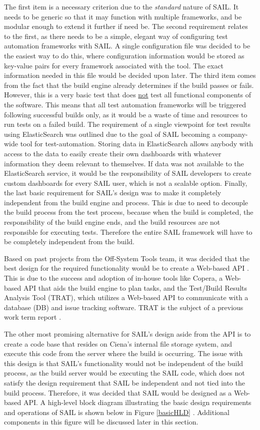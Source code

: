 \documentclass[10pt, titlepage, onecolumn, openany]{article}
\begin{document}
The first item is a necessary criterion due to the \textit{standard} nature of SAIL.
It needs to be generic so that it may function with multiple frameworks, and be
modular enough to extend it further if need be. The second requirement relates to the first,
as there needs to be a simple, elegant way of configuring test automation frameworks
with SAIL. A single configuration file was decided to be the easiest way to do this,
where configuration information would be stored as key-value pairs for every framework
associated with the tool. The exact information needed in this file would be decided upon
later. The third item comes from the fact that the build engine already determines if
the build passes or fails. However, this is a very basic test that does \underline{not}
test all functional components of the software. This means that all test automation
frameworks will be triggered following successful builds only, as it would be a
waste of time and resources to run tests on a failed build. The requirement of a
single viewpoint for test results using ElasticSearch was outlined due to the
goal of SAIL becoming a company-wide tool for test-automation. Storing data in
ElasticSearch allows anybody with access to the data to easily create their own
dashboards with whatever information they deem relevant to themselves. If data
was not available to the ElasticSearch service, it would be the responsibility
of SAIL developers to create custom dashboards for every SAIL user, which is not
a scalable option. Finally, the last basic requirement for SAIL's design was to
make it completely independent from the build engine and process. This is due to
need to decouple the build process from the test process, because when the build
is completed, the responsibility of the build engine ends, and the build
resources are not responsible for executing tests. Therefore the entire SAIL
framework will have to be completely independent from the build.

Based on past projects from the Off-System Tools team, it was decided that the
best design for the required functionality would be to create a Web-based API
\cite{pftoolsWebApi}. This is due to the success and adoption of in-house tools
like Copera, a Web-based API that aids the build engine to plan tasks, and the
Test/Build Results Analysis Tool (TRAT), which utilizes a Web-based API to
communicate with a database (DB) and issue tracking software. TRAT is the
subject of a previous work term report \cite{tratReport}.

The other most promising alternative for SAIL's design aside from the API is to create a
code base that resides on Ciena's internal file storage system,
and execute this code
from the server where the build is occurring. The issue with
this design
is that SAIL's functionality would not be independent of the
build process, as the
build server would be executing the SAIL code, which does not
satisfy the design requirement
that SAIL be independent and not tied into the build process.
Therefore, it was decided
that SAIL would be designed as a Web-based API. A high-level
block diagram illustrating the
basic design requirements and operations of SAIL is shown below
in Figure \ref{basicHLD} \cite{sailbasichld}. Additional components
in this figure will
be discussed later in this section.
\end{document}
